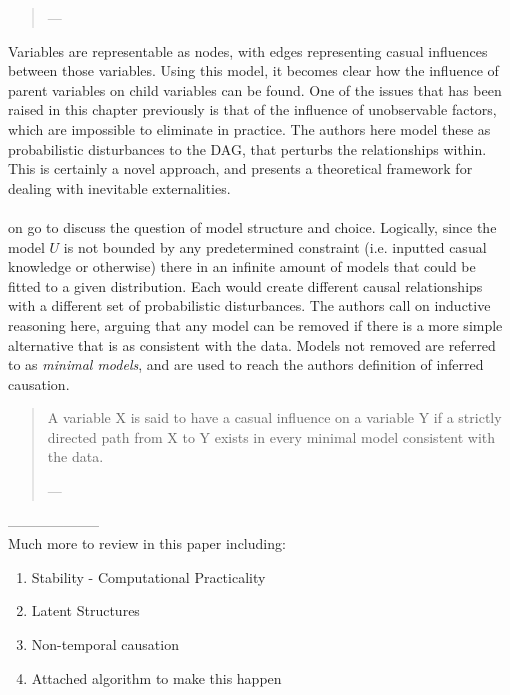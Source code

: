 {\begin{quote}
\hspace{2cm}---  \cite {pearl1995theory}
\end{quote}
Variables are representable as nodes, with edges representing casual influences between those variables. Using this model, it becomes clear how the influence of parent variables on child variables can be found. One of the issues that has been raised in this chapter previously is that of the influence of unobservable factors, which are impossible to eliminate in practice. The authors here model these as probabilistic disturbances to the DAG, that perturbs the relationships within. This is certainly a novel approach, and presents a theoretical framework for dealing with inevitable externalities.\\\\
\cite {pearl1995theory} on go to discuss the question of model structure and choice. Logically, since the model $U$ is not bounded by any predetermined constraint (i.e. inputted casual knowledge or otherwise) there in an infinite amount of models that could be fitted to a given distribution. Each would create different causal relationships with a different set of probabilistic disturbances. The authors call on inductive reasoning here, arguing that any model can be removed if there is a more simple alternative that is as consistent with the data. Models not removed are referred to as {\it minimal models}, and are used to reach the authors definition of inferred causation. 
\begin{quote}
A variable X is said to have a casual influence on a variable Y if a strictly directed path from X to Y exists in every minimal model consistent with the data. 

\hspace{2cm}---  \cite {pearl1995theory}
\end{quote}

--------------------\\
Much more to review in this paper including:
\begin{enumerate}
\item{Stability - Computational Practicality}
\item{Latent Structures}
\item{Non-temporal causation}
\item{Attached algorithm to make this happen}
\end{enumerate}


}